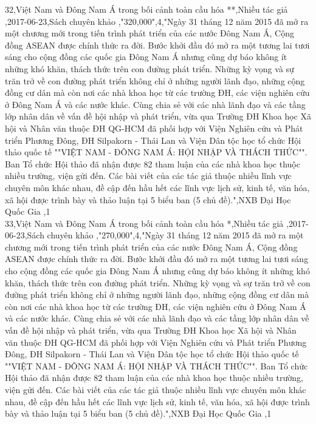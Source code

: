 \documentclass[a4paper]{article}
\begin{document}
32,Việt Nam và Đông Nam Á trong bối cảnh toàn cầu hóa **,Nhiều tác giả ,2017-06-23,Sách chuyên khảo ,"320,000",4,"Ngày 31 tháng 12 năm 2015 đã mở ra một chương mới trong tiến trình phát triển của các nước Đông Nam Á, Cộng đồng ASEAN được chính thức ra đời. Bước khởi đầu đó mở ra một tương lai tươi sáng cho cộng đồng các quốc gia Đông Nam Á nhưng cũng dự báo không ít những khó khăn, thách thức trên con đường phát triển. Những kỳ vọng và sự trăn trở về con đường phát triển không chỉ ở những người lãnh đạo, những cộng đồng cư dân mà còn nơi các nhà khoa học từ các trường ĐH, các viện nghiên cứu ở Đông Nam Á và các nước khác. Cùng chia sẻ với các nhà lãnh đạo và các tầng lớp nhân dân về vấn đề hội nhập và phát triển, vừa qua Trường ĐH Khoa học Xã hội và Nhân văn thuộc ĐH QG-HCM đã phối hợp với Viện Nghiên cứu và Phát triển Phương Đông, ĐH Silpakorn - Thái Lan và Viện Dân tộc học tổ chức Hội thảo quốc tế ""VIỆT NAM - ĐÔNG NAM Á: HỘI NHẬP VÀ THÁCH THỨC"". Ban Tổ chức Hội thảo đã nhận được 82 tham luận của các nhà khoa học thuộc nhiều trường, viện gửi đến. Các bài viết của các tác giả thuộc nhiều lĩnh vực chuyên môn khác nhau, đề cập đến hầu hết các lĩnh vực lịch sử, kinh tế, văn hóa, xã hội được trình bày và thảo luận tại 5 biểu ban (5 chủ đề).",NXB Đại Học Quốc Gia ,1\\
33,Việt Nam và Đông Nam Á trong bối cảnh toàn cầu hóa *,Nhiều tác giả ,2017-06-23,Sách chuyên khảo ,"270,000",4,"Ngày 31 tháng 12 năm 2015 đã mở ra một chương mới trong tiến trình phát triển của các nước Đông Nam Á, Cộng đồng ASEAN được chính thức ra đời. Bước khởi đầu đó mở ra một tương lai tươi sáng cho cộng đồng các quốc gia Đông Nam Á nhưng cũng dự báo không ít những khó khăn, thách thức trên con đường phát triển. Những kỳ vọng và sự trăn trở về con đường phát triển không chỉ ở những người lãnh đạo, những cộng đồng cư dân mà còn nơi các nhà khoa học từ các trường ĐH, các viện nghiên cứu ở Đông Nam Á và các nước khác. Cùng chia sẻ với các nhà lãnh đạo và các tầng lớp nhân dân về vấn đề hội nhập và phát triển, vừa qua Trường ĐH Khoa học Xã hội và Nhân văn thuộc ĐH QG-HCM đã phối hợp với Viện Nghiên cứu và Phát triển Phương Đông, ĐH Silpakorn - Thái Lan và Viện Dân tộc học tổ chức Hội thảo quốc tế ""VIỆT NAM - ĐÔNG NAM Á: HỘI NHẬP VÀ THÁCH THỨC"". Ban Tổ chức Hội thảo đã nhận được 82 tham luận của các nhà khoa học thuộc nhiều trường, viện gửi đến. Các bài viết của các tác giả thuộc nhiều lĩnh vực chuyên môn khác nhau, đề cập đến hầu hết các lĩnh vực lịch sử, kinh tế, văn hóa, xã hội được trình bày và thảo luận tại 5 biểu ban (5 chủ đề).",NXB Đại Học Quốc Gia ,1\\
\end{document}
